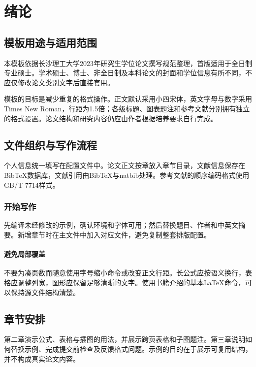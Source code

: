 \chapter{绪论}
\section{模板用途与适用范围}
本模板依据长沙理工大学2023年研究生学位论文撰写规范整理，首版适用于全日制专业硕士。学术硕士、博士、非全日制及本科论文的封面和学位信息有所不同，不应仅修改论文类别文字后直接套用。

模板的目标是减少重复的格式操作。正文默认采用小四宋体，英文字母与数字采用Times New Roman，行距为1.5倍；各级标题、图表题注和参考文献分别拥有独立的格式设置。论文结构和研究内容仍应由作者根据培养要求自行完成。
\section{文件组织与写作流程}
个人信息统一填写在配置文件中。论文正文按章放入章节目录，文献信息保存在BibTeX数据库，文献引用由BibTeX与natbib处理。参考文献的顺序编码格式使用GB/T 7714样式\cite{gbt7714}。
\subsection{开始写作}
先编译未经修改的示例，确认环境和字体可用；然后替换题目、作者和中英文摘要。新增章节时在主文件中加入对应文件，避免复制整套排版配置。
\subsubsection{避免局部覆盖}
不要为凑页数而随意使用字号缩小命令或改变正文行距。长公式应按语义换行，表格应调整列宽，图形应保留足够清晰的文字。使用书籍介绍的基本LaTeX命令，可以保持源文件结构清楚\cite{lamport1994}。
\section{章节安排}
第二章演示公式、表格与插图的用法，并展示跨页表格和子图题注。第三章说明如何替换示例、完成提交前检查及反馈格式问题。示例的目的在于展示可复用结构，并不构成真实论文内容。
